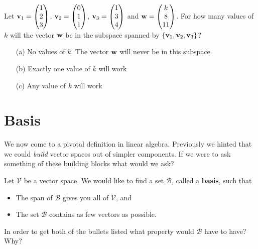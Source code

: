 \begin{problem}
    Let ${\bf v}_1 = \begin{pmatrix} 1 \\ 2 \\ 3 \end{pmatrix}$, ${\bf v}_2 = \begin{pmatrix} 0 \\
        1 \\ 1 \end{pmatrix}$, ${\bf v}_3 = \begin{pmatrix} 1 \\ 3 \\ 4 \end{pmatrix}$ and
            ${\bf w} = \begin{pmatrix} k \\ 8 \\ 11\end{pmatrix}$.  For how many values of $k$
                will the vector ${\bf w}$ be in the subspace spanned by
                $\{{\bf v}_1,{\bf v}_2,{\bf v}_3\}$?
    \begin{enumerate}
        \item[(a)] No values of $k$.  The vector ${\bf w}$ will never be in this subspace.
        \item[(b)] Exactly one value of $k$ will work
        \item[(c)] Any value of $k$ will work
    \end{enumerate}
\end{problem}

%         


\newpage\section{Basis}
We now come to a pivotal definition in linear algebra.  Previously we hinted that we
could {\it build} vector spaces out of simpler components.  If we were to ask something of
these building blocks what would we ask?
\begin{problem}
    Let $\mathcal{V}$ be a vector space.  We would like to find a set $\mathcal{B}$,
    called a {\bf basis}, such that
    \begin{itemize}
        \item The span of $\mathcal{B}$ gives you all of $\mathcal{V}$, and 
        \item The set $\mathcal{B}$ contains as few vectors as possible.
    \end{itemize}
    In order to get both of the bullets listed what property would $\mathcal{B}$ have to
    have?  Why?
\end{problem}

